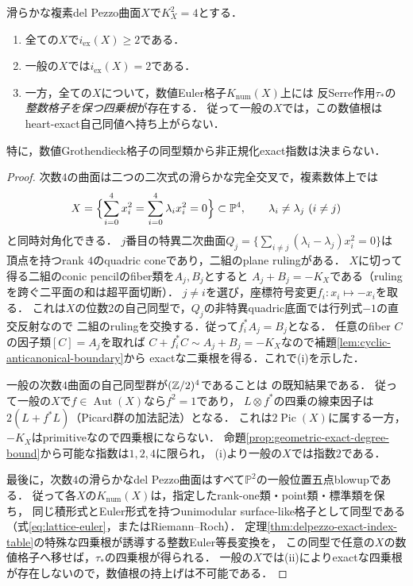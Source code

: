 \documentclass[11pt,a4paper]{ltjsarticle}
\begin{document}
\begin{proposition}[同じ数値格子でもexactな四乗根は変わる]
\label{prop:degree-four-lifting-gap}
滑らかな複素del Pezzo曲面$X$で$K_X^2=4$とする．
\begin{enumerate}[label=(\roman*)]
\item 全ての$X$で$i_{\mathrm{ex}}(X)\ge2$である．
\item 一般の$X$では$i_{\mathrm{ex}}(X)=2$である．
\item 一方，全ての$X$について，数値Euler格子$K_{\mathrm{num}}(X)$上には
反Serre作用$\tau_*$の\emph{整数格子を保つ四乗根}が存在する．
従って一般の$X$では，この数値根はheart-exact自己同値へ持ち上がらない．
\end{enumerate}
特に，数値Grothendieck格子の同型類から非正規化exact指数は決まらない．
\end{proposition}
\begin{proof}
次数$4$の曲面は二つの二次式の滑らかな完全交叉で，複素数体上では
\[
 X=\Bigl\{\sum_{i=0}^4x_i^2=\sum_{i=0}^4\lambda_i x_i^2=0\Bigr\}
 \subset\mathbb P^4,\qquad\lambda_i\ne\lambda_j\ (i\ne j)
\]
と同時対角化できる\cite{DolgachevMartin,HassettKreschTschinkel}．
$j$番目の特異二次曲面$Q_j=\{\sum_{i\ne j}(\lambda_i-\lambda_j)x_i^2=0\}$は
頂点を持つrank $4$のquadric coneであり，二組のplane rulingがある．
$X$に切って得る二組のconic pencilのfiber類を$A_j,B_j$とすると
$A_j+B_j=-K_X$である（rulingを跨ぐ二平面の和は超平面切断）．
$j\ne i$を選び，座標符号変更$f_i:x_i\mapsto-x_i$を取る．
これは$X$の位数2の自己同型で，$Q_j$の非特異quadric底面では行列式$-1$の直交反射なので
二組のrulingを交換する．従って$f_i^*A_j=B_j$となる．
任意のfiber $C$の因子類$[C]=A_j$を取れば
$C+f_i^*C\sim A_j+B_j=-K_X$なので補題\ref{lem:cyclic-anticanonical-boundary}から
exactな二乗根を得る．これで(i)を示した．

一般の次数$4$曲面の自己同型群が$(\mathbb Z/2)^4$であることは
\cite[Introduction]{HassettKreschTschinkel}の既知結果である．
従って一般の$X$で$f\in\operatorname{Aut}(X)$なら$f^2=1$であり，
$L\otimes f^*$の四乗の線束因子は
$2(L+f^*L)$（Picard群の加法記法）となる．
これは$2\operatorname{Pic}(X)$に属する一方，$-K_X$はprimitiveなので四乗根にならない．
命題\ref{prop:geometric-exact-degree-bound}から可能な指数は$1,2,4$に限られ，
(i)より一般の$X$では指数$2$である．

最後に，次数$4$の滑らかなdel Pezzo曲面はすべて$\mathbb P^2$の一般位置五点blowupである．
従って各$X$の$K_{\mathrm{num}}(X)$は，指定したrank-one類・point類・標準類を保ち，
同じ積形式とEuler形式を持つunimodular surface-like格子として同型である
（式\eqref{eq:lattice-euler}，またはRiemann--Roch）．
定理\ref{thm:delpezzo-exact-index-table}の特殊な四乗根が誘導する整数Euler等長変換を，
この同型で任意の$X$の数値格子へ移せば，$\tau_*$の四乗根が得られる．
一般の$X$では(ii)によりexactな四乗根が存在しないので，数値根の持上げは不可能である．
\end{proof}
\end{document}
